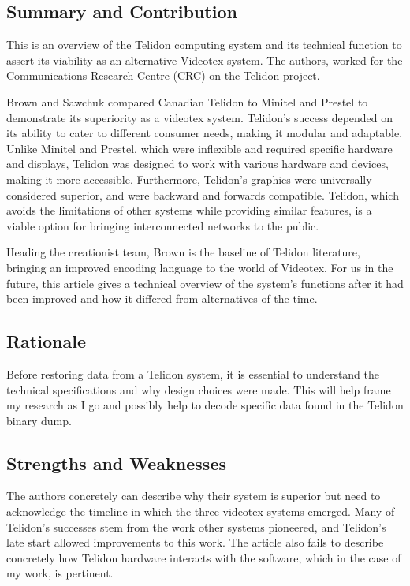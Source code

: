 \documentclass[sigconf]{acmart}
\begin{document}

\subsection{Summary and Contribution}

This is an overview of the Telidon computing system and its technical function to assert its viability as an alternative Videotex system. The authors, worked for the Communications Research Centre (CRC) on the Telidon project.

Brown and Sawchuk compared Canadian Telidon to Minitel and Prestel to demonstrate its superiority as a videotex system. Telidon's success depended on its ability to cater to different consumer needs, making it modular and adaptable. Unlike Minitel and Prestel, which were inflexible and required specific hardware and displays, Telidon was designed to work with various hardware and devices, making it more accessible. Furthermore, Telidon's graphics were universally considered superior, and were backward and forwards compatible. Telidon, which avoids the limitations of other systems while providing similar features, is a viable option for bringing interconnected networks to the public.

Heading the creationist team, Brown is the baseline of Telidon literature, bringing an improved encoding language to the world of Videotex. For us in the future, this article gives a technical overview of the system's functions after it had been improved and how it differed from alternatives of the time.

\subsection{Rationale}

Before restoring data from a Telidon system, it is essential to understand the technical specifications and why design choices were made. This will help frame my research as I go and possibly help to decode specific data found in the Telidon binary dump.

\subsection{Strengths and Weaknesses}

The authors concretely can describe why their system is superior but need to acknowledge the timeline in which the three videotex systems emerged. Many of Telidon's successes stem from the work other systems pioneered, and Telidon's late start allowed improvements to this work. The article also fails to describe concretely how Telidon hardware interacts with the software, which in the case of my work, is pertinent. 
\end{document}
